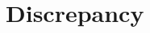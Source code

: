 \documentclass{amsart}
\theoremstyle{plain}
\newtheorem{claim}{}[theorem]
\newtheorem{lemma}[theorem]{Lemma}
\theoremstyle{definition}
\newcommand{\set}[1]{\left\{#1\right\}}
\renewcommand{\ss}{\subseteq}
\newenvironment{subproof}[1][\proofname]{%
  \renewcommand{\qedsymbol}{$\blacksquare$}%
  \begin{proof}[Subproof:]%
}{%
  \end{proof}%
}
\begin{document}

  




\section{Discrepancy}
\end{document}
